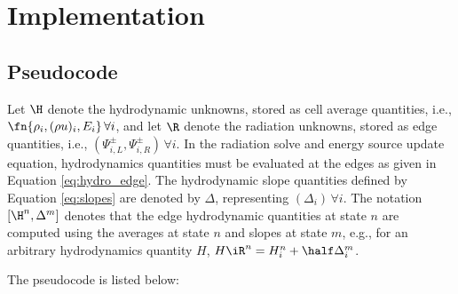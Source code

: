 \section{Implementation}
\subsection{Pseudocode}
Let $\H$ denote the hydrodynamic unknowns, stored as cell average quantities,
i.e., $\fn{\rho_i,(\rho u)_i,E_i}\,\forall i$,
and let $\R$ denote the radiation unknowns, stored as edge quantities,
i.e., $(\Psi_{i,L}^\pm,\Psi_{i,R}^\pm)\,\forall i$.
In the radiation solve and energy
source update equation, hydrodynamics quantities must be evaluated at the
edges as given in Equation \eqref{eq:hydro_edge}.
The hydrodynamic slope quantities defined by Equation \eqref{eq:slopes} are denoted
by $\Delta$, representing $(\Delta_i)\,\forall i$.
The notation $[\H^n,\Delta^m]$ denotes that the edge hydrodynamic quantities
at state $n$ are computed using the averages at state $n$ and slopes at
state $m$, e.g., for an arbitrary hydrodynamics quantity $H$,
$H\iR^n = H_i^n + \half\Delta_i^m$.

The pseudocode is listed below:

